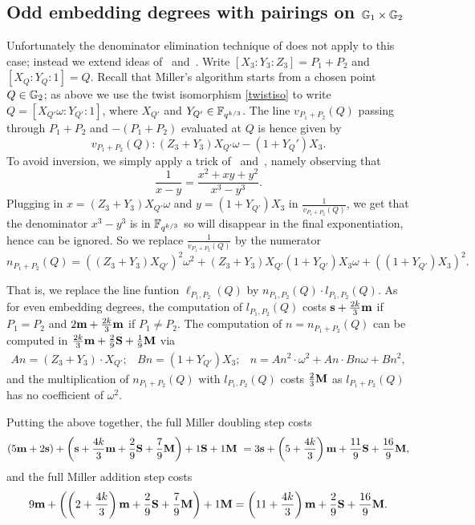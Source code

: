 \subsection{Odd embedding degrees with pairings on $\mathbb{G}_{1} \times \mathbb{G}_{2}$}

Unfortunately the denominator elimination technique of \cite{GGX10} does not apply to this case;
instead we extend ideas of~\cite{2008/lin} and~\cite{2009/deg15}.
Write $[X_3:Y_3:Z_3] = P_1 + P_2$ and $[X_Q:Y_Q:1] = Q$. 
Recall that Miller's algorithm starts from a chosen point $Q \in \mathbb{G}_{2}$;
as above we use the twist isomorphism \eqref{twistiso} to write
$Q = [X_{Q'}\omega:Y_{Q'}:1]$, where $X_{Q'}$ and $Y_{Q'} \in \mathbb{F}_{q^{k/3}}$.
The line $v_{P_1+P_2}(Q)$ passing through $P_1+P_2$ and $-(P_1 + P_2)$ 
evaluated at $Q$
is hence given by
\[v_{P_1+P_2}(Q): 
(Z_3 + Y_3)X_{Q'}\omega - (1+Y_Q')X_3.\]
To avoid inversion, we simply apply a trick of~\cite{2008/lin} and~\cite{2009/deg15}, 
namely observing that
\[\frac{1}{x-y} = \frac{x^2 + xy + y^2}{x^3-y^3}.\]
Plugging in $x = (Z_3 + Y_3)X_{Q'}\omega$ and $y = (1+Y_{Q'})X_3$ in $\frac{1}{v_{P_1+P_2}(Q)}$,
we get that the denominator $x^3 - y^3$ is in $\mathbb{F}_{q^{k/3}}$ so will disappear in the final exponentiation, hence can be ignored.
So we replace $\frac{1}{v_{P_1+P_2}(Q)}$ by the numerator 
$$n_{P_1+P_2}(Q) = ((Z_3 + Y_3)X_{Q'})^2\omega^2 
+ (Z_3 + Y_3)X_{Q'}(1+Y_{Q'})X_3\omega 
+ ((1+Y_{Q'})X_3)^2.$$

That is, we replace the line funtion $\ell_{P_1,P_2}(Q)$ by $n_{P_1,P_2}(Q) \cdot l_{P_1,P_2}(Q)$.
As for even embedding degrees, the computation of $l_{P_1,P_2}(Q)$ costs $\textbf{s} + \frac{2k}{3}\textbf{m}$ if $P_1 = P_2$ and $2\textbf{m} + \frac{2k}{3}\textbf{m}$ if $P_1 \neq P_2$. 
The computation of $n = n_{P_1+P_2}(Q)$ can be computed in
$\frac{2k}{3}\textbf{m} + \frac{2}{9}\textbf{S} + \frac{1}{9}\textbf{M}$ via
\[\begin{array}{cccc}
An = (Z_3 + Y_3)\cdot X_{Q'}; &
Bn = (1+Y_{Q'})X_3; &
n = An^2\cdot\omega^2 + An\cdot Bn\omega + Bn^2,
\end{array}\]
and the multiplication of $n_{P_1+P_2}(Q)$ with $l_{P_1,P_2}(Q)$ costs $\frac{2}{3}\textbf{M}$ 
as $l_{P_1+P_2}(Q)$ has no coefficient of $\omega^2$.

Putting the above together, the full Miller doubling step costs
\[(5\textbf{m} + 2\textbf{s}) + \left(\textbf{s} + \frac{4k}{3}\textbf{m} + \frac{2}{9}\textbf{S} + \frac{7}{9}\textbf{M}\right)  + 1\textbf{S} + 1\textbf{M}\
=3\textbf{s} + \left(5 + \frac{4k}{3}\right)\textbf{m} + \frac{11}{9}\textbf{S} + \frac{16}{9}\textbf{M},\]
and the full Miller addition step costs 
\[9\textbf{m} + \left( \left(2+\frac{4k}{3}\right)\textbf{m} + \frac{2}{9}\textbf{S} + \frac{7}{9}\textbf{M}\right) + 1\textbf{M}
=\left( 11+\frac{4k}{3}\right)\textbf{m} + \frac{2}{9}\textbf{S} + \frac{16}{9}\textbf{M}.\]

